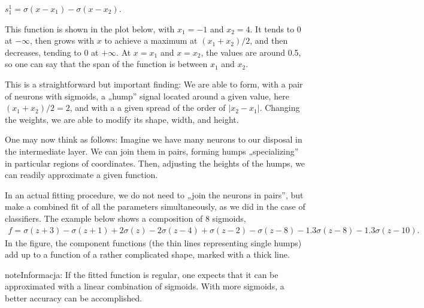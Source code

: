 \documentclass[a4paper,12pt,polish]{jupyterBook}
\begin{document}
\sphinxAtStartPar
\(s_1^{1}=\sigma(x-x_1)-\sigma(x-x_2)\).

\sphinxAtStartPar
This function is shown in the plot below, with \(x_1=-1\) and \(x_2=4\).
It tends to 0 at \(- \infty\), then grows with \(x\) to achieve a maximum at
\((x_1+x_2)/2\), and then decreases, tending to 0 at \(+\infty\). At \(x=x_1\) and \(x=x_2\), the values are around 0.5, so one can say that the span of the function is between \(x_1\) and \(x_2\).
\begin{sphinxVerbatimOutput}

\noindent{}
\end{sphinxVerbatimOutput}

\sphinxAtStartPar
This is a straightforward but important finding:
We are able to form, with a pair of neurons with sigmoids, a „hump” signal located around a given value, here \( (x_1 + x_2) / 2 = 2\), and with a a given spread of the order of \(|x_2-x_1|\). Changing the weights, we are able to modify its shape, width, and height.

\sphinxAtStartPar
One may now think as follows: Imagine we have many neurons to our disposal in the intermediate layer. We can join them in pairs, forming humps „specializing” in particular regions of coordinates. Then, adjusting the heights of the humps, we can readily approximate a given function.

\sphinxAtStartPar
In an actual fitting procedure, we do not need to „join the neurons in pairs”, but make a combined fit of all the parameters simultaneously, as we did in the case of classifiers. The example below shows a composition of 8 sigmoids,
\begin{equation*}
\begin{split}
f = \sigma(z+3)-\sigma(z+1)+2 \sigma(z)-2\sigma(z-4)+
      \sigma(z-2)-\sigma(z-8)-1.3 \sigma(z-8)-1.3\sigma(z-10). 
\end{split}
\end{equation*}
\sphinxAtStartPar
In the figure, the component functions (the thin lines representing single humps) add up to a function of a rather complicated shape, marked with a thick line.
\begin{sphinxVerbatimOutput}

\noindent{}
\end{sphinxVerbatimOutput}

\begin{sphinxadmonition}{note}{Informacja:}
\sphinxAtStartPar
If the fitted function is regular, one expects that it can be approximated with a linear combination of sigmoids. With more sigmoids, a better accuracy can be accomplished.
\end{sphinxadmonition}
\end{document}
